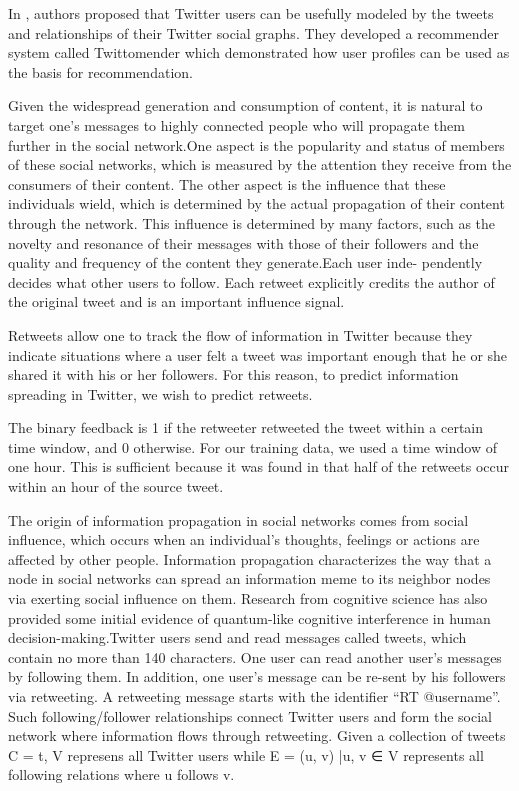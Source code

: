 \documentclass[twocolumn]{svjour3}          %
\begin{document}
In \cite{hannon2010recommending}, authors proposed that Twitter users can be usefully modeled by the tweets and relationships of their Twitter social graphs. They developed a recommender system called Twittomender which demonstrated how user profiles can be used as the basis for recommendation.

Given the widespread generation and consumption of content, it is natural to target one’s messages to highly connected people who will propagate them further in the social network.One aspect is the popularity and status of members of
these social networks, which is measured by the attention they receive from the consumers of their content. The other aspect is the influence that these individuals wield, which is determined by the actual propagation of their content through the network. This influence is determined by many factors, such as the novelty and resonance of their messages with those of their followers and the quality and frequency of the content they generate.Each user inde- pendently decides what other users to follow. Each retweet explicitly credits the author of the original tweet \cite{boyd2010tweet} and is an important influence signal.\cite{romero2011influence}

Retweets allow one to track the flow of information in Twitter because they indicate situations where a user felt a tweet was important enough that he or she shared it with his or her followers. For this reason, to predict information spreading in Twitter, we wish to predict retweets.

The binary feedback is 1 if the retweeter retweeted the tweet within a certain time window, and 0 otherwise. For our training data, we used a time window of one hour. This is sufficient because it was found in \cite{kwak2010twitter} that half of the retweets occur within an hour of the source tweet.

The origin of information propagation in social networks comes from social influence, which occurs when an individual’s thoughts, feelings or actions are affected by other people. Information propagation characterizes the way that a node in social networks can spread an information meme to its neighbor nodes via exerting social influence on them.
Research from cognitive science has also provided some initial evidence of quantum-like cognitive interference in human
decision-making.Twitter users send and read messages called tweets, which contain no more than 140 characters.
One user can read another user’s messages by following them. In addition, one user’s message can be re-sent by his followers via retweeting. A retweeting message starts with the identifier “RT @username”. Such following/follower relationships connect Twitter users and form the social network where information flows through retweeting. Given a collection of tweets C = {t}, V represens all Twitter users while E = {(u, v) |u, v ∈ V} represents all following relations where u follows v.
\end{document}
